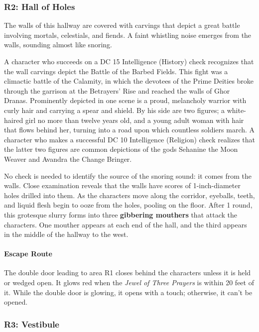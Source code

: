 \documentclass[letterpaper, 11pt, bg=full, twocolumn]{dndbook}
\begin{document}
\subsubsection{R2: Hall of Holes}

\begin{DndReadAloud}
The walls of this hallway are covered with carvings that depict a great battle involving mortals, celestials, and fiends. A faint whistling noise emerges from the walls, sounding almost like snoring.
\end{DndReadAloud}

A character who succeeds on a DC 15 Intelligence (History) check recognizes that the wall carvings depict the Battle of the Barbed Fields. This fight was a climactic battle of the Calamity, in which the devotees of the Prime Deities broke through the garrison at the Betrayers' Rise and reached the walls of Ghor Dranas. Prominently depicted in one scene is a proud, melancholy warrior with curly hair and carrying a spear and shield. By his side are two figures; a white-haired girl no more than twelve years old, and a young adult woman with hair that flows behind her, turning into a road upon which countless soldiers march. A character who makes a successful DC 10 Intelligence (Religion) check realizes that the latter two figures are common depictions of the gods Sehanine the Moon Weaver and Avandra the Change Bringer.

No check is needed to identify the source of the snoring sound: it comes from the walls. Close examination reveals that the walls have scores of 1-inch-diameter holes drilled into them. As the characters move along the corridor, eyeballs, teeth, and liquid flesh begin to ooze from the holes, pooling on the floor. After 1 round, this grotesque slurry forms into three \textbf{gibbering mouthers} that attack the characters. One mouther appears at each end of the hall, and the third appears in the middle of the hallway to the west.

\paragraph{Escape Route}

The double door leading to area R1 closes behind the characters unless it is held or wedged open. It glows red when the \textit{Jewel of Three Prayers} is within 20 feet of it. While the double door is glowing, it opens with a touch; otherwise, it can't be opened.

\subsubsection{R3: Vestibule}
\end{document}
